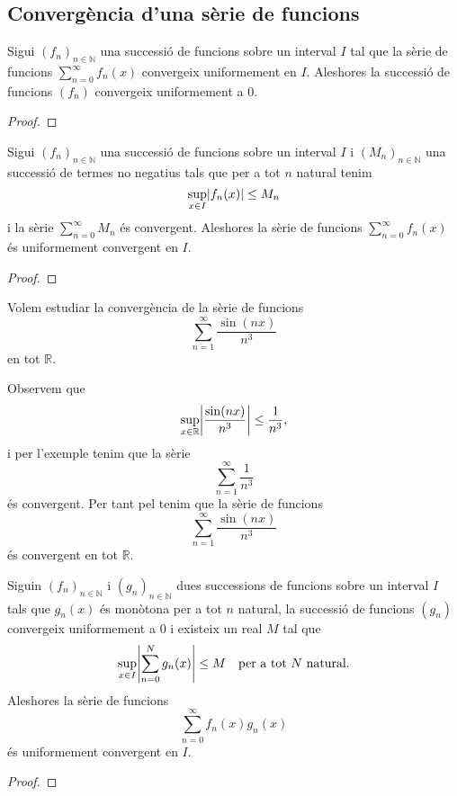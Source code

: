 \documentclass[../Apunts.tex]{subfiles}
\begin{document}
	\subsection{Convergència d'una sèrie de funcions}
	\begin{proposition}
		\label{prop:si una sêrie de funcions convergeix uniformement aleshores la successió de funcions convergeix uniformement a 0}
		Sigui \((f_{n})_{n\in\mathbb{N}}\) una successió de funcions sobre un interval \(I\) tal que la sèrie de funcions \(\sum_{n=0}^{\infty}f_{n}(x)\) convergeix uniformement en \(I\). Aleshores la successió de funcions \((f_{n})\) convergeix uniformement a \(0\).
		\begin{proof}
		\end{proof}
	\end{proposition}
	\begin{theorem}
		\label{thm:criteri M de Weierstrass}
		Sigui \((f_{n})_{n\in\mathbb{N}}\) una successió de funcions sobre un interval \(I\) i \((M_{n})_{n\in\mathbb{N}}\) una successió de termes no negatius tals que per a tot \(n\) natural tenim 
		\[\sup_{x\in I}\abs{f_{n}(x)}\leq M_{n}\]
		i la sèrie \(\sum_{n=0}^{\infty}M_{n}\) és convergent. Aleshores la sèrie de funcions \(\sum_{n=0}^{\infty}f_{n}(x)\) és uniformement convergent en \(I\).
		\begin{proof}
		\end{proof}
	\end{theorem}
	\begin{example}
		Volem estudiar la convergència de la sèrie de funcions
		\[\sum_{n=1}^{\infty}\frac{\sin(nx)}{n^{3}}\]
		en tot \(\mathbb{R}\).
		\begin{solution}
			Observem que
			\[\sup_{x\in\mathbb{R}}\abs{\frac{\sin(nx)}{n^{3}}}\leq\frac{1}{n^{3}},\]
			i per l'exemple  tenim que la sèrie
			\[\sum_{n=1}^{\infty}\frac{1}{n^{3}}\]
			és convergent. Per tant pel  tenim que la sèrie de funcions
			\[\sum_{n=1}^{\infty}\frac{\sin(nx)}{n^{3}}\]
			és convergent en tot \(\mathbb{R}\).
		\end{solution}
	\end{example}
	\begin{theorem}
		\label{thm:criteri de Dirichlet}
		Siguin \((f_{n})_{n\in\mathbb{N}}\) i \((g_{n})_{n\in\mathbb{N}}\) dues successions de funcions sobre un interval \(I\) tals que \(g_{n}(x)\) és monòtona per a tot \(n\) natural, la successió de funcions \((g_{n})\) convergeix uniformement a \(0\) i existeix un real \(M\) tal que
		\[\sup_{x\in I}\abs{\sum_{n=0}^{N}g_{n}(x)}\leq M\quad\text{per a tot }N\text{ natural}.\]
		Aleshores la sèrie de funcions
		\[\sum_{n=0}^{\infty}f_{n}(x)g_{n}(x)\]
		és uniformement convergent en \(I\).
		\begin{proof}
		\end{proof}
	\end{theorem}
\end{document}
